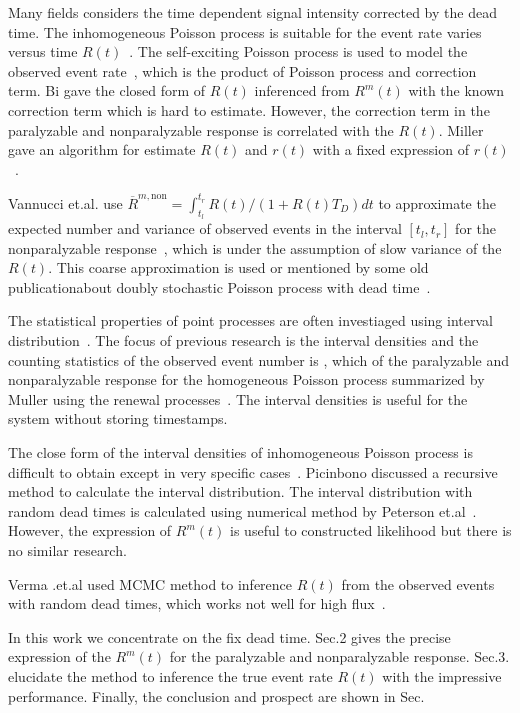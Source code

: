 Many fields considers the time dependent signal intensity corrected by the dead time. The inhomogeneous Poisson process is suitable for the event rate varies versus time $R(t)$~\cite{}. The self-exciting Poisson process is used to model the observed event rate~\cite{bi:1989closedform}, which is the product of Poisson process and correction term. Bi gave the closed form of $R(t)$ inferenced from $R^m(t)$ with the known correction term which is hard to estimate. However, the correction term in the paralyzable and nonparalyzable response is correlated with the $R(t)$. Miller gave an algorithm for estimate $R(t)$ and $r(t)$ with a fixed expression of $r(t)$~\cite{miller:1985algorithms}.

Vannucci et.al. use $\overline{R}^{m,\mathrm{non}}=\int_{t_l}^{t_r}{R(t)/\left(1+R(t)T_D\right)dt}$ to approximate the expected number and variance of observed events in the interval $[t_l,t_r]$ for the nonparalyzable response~\cite{Vannucci:1978,Vannucci:1981}, which is under the assumption of slow variance of the $R(t)$. This coarse approximation is used or mentioned by some old publicationabout doubly stochastic Poisson process with dead time~\cite{Saleh:1981,Teich:2000}.

The statistical properties of point processes are often investiaged using interval distribution~\cite{}. The focus of previous research is the interval densities and the counting statistics of the observed event number is , which of the paralyzable and nonparalyzable response for the homogeneous Poisson process summarized by Muller using the renewal processes~\cite{müller1973deadtime,muller:1994,yu:2000mean,pomme:2015uncertainty}. The interval densities is useful for the system without storing timestamps.

The close form of the interval densities of inhomogeneous Poisson process is difficult to obtain except in very specific cases~\cite{Picinbono:2009output}. Picinbono discussed a recursive method to calculate the interval distribution. The interval distribution with random dead times is calculated using numerical method by Peterson et.al~\cite{Peterson:2021numerical}. However, the expression of $R^m(t)$ is useful to constructed likelihood but there is no similar research.

Verma .et.al used MCMC method to inference $R(t)$ from the observed events with random dead times, which works not well for high flux~\cite{Verma:2017inhomogeneous}.


In this work we concentrate on the fix dead time. Sec.2 gives the precise expression of the $R^m(t)$ for the paralyzable and nonparalyzable response. Sec.3. elucidate the method to inference the true event rate $R(t)$ with the impressive performance. Finally, the conclusion and prospect are shown in Sec.
